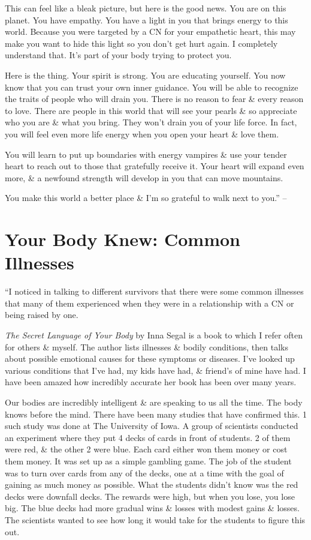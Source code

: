 \documentclass{article}
\numberwithin{equation}{section}
\begin{document}
This can feel like a bleak picture, but here is the good news. You are on this planet. You have empathy. You have a light in you that brings energy to this world. Because you were targeted by a CN for your empathetic heart, this may make you want to hide this light so you don't get hurt again. I completely understand that. It's part of your body trying to protect you.

Here is the thing. Your spirit is strong. You are educating yourself. You now know that you can trust your own inner guidance. You will be able to recognize the traits of people who will drain you. There is no reason to fear \& every reason to love. There are people in this world that will see your pearls \& so appreciate who you are \& what you bring. They won't drain you of your life force. In fact, you will feel even more life energy when you open your heart \& love them.

You will learn to put up boundaries with energy vampires \& use your tender heart to reach out to those that gratefully receive it. Your heart will expand even more, \& a newfound strength will develop in you that can move mountains.

You make this world a better place \& I'm so grateful to walk next to you.'' -- \cite[pp. 138--141]{Mirza2017}


\section{Your Body Knew: Common Illnesses}
``I noticed in talking to different survivors that there were some common illnesses that many of them experienced when they were in a relationship with a CN or being raised by one.

\textit{The Secret Language of Your Body} by Inna Segal is a book to which I refer often for others \& myself. The author lists illnesses \& bodily conditions, then talks about possible emotional causes for these symptoms or diseases. I've looked up various conditions that I've had, my kids have had, \& friend's of mine have had. I have been amazed how incredibly accurate her book has been over many years.

Our bodies are incredibly intelligent \& are speaking to us all the time. The body knows before the mind. There have been many studies that have confirmed this. 1 such study was done at The University of Iowa. A group of scientists conducted an experiment where they put 4 decks of cards in front of students. 2 of them were red, \& the other 2 were blue. Each card either won them money or cost them money. It was set up as a simple gambling game. The job of the student was to turn over cards from any of the decks, one at a time with the goal of gaining as much money as possible. What the students didn't know was the red decks were downfall decks. The rewards were high, but when you lose, you lose big. The blue decks had more gradual wins \& losses with modest gains \& losses. The scientists wanted to see how long it would take for the students to figure this out.
\end{document}

